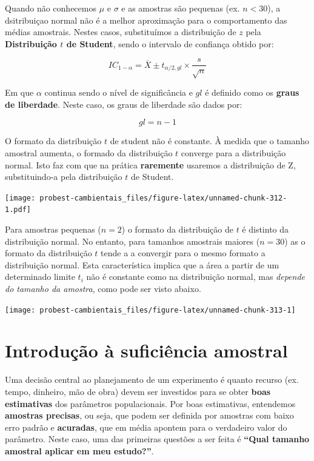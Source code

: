 \documentclass[
]{book}
\begin{document}
Quando não conhecemos \(\mu\) e \(\sigma\) e as amostras são pequenas (ex. \(n<30\)), a dsitribuiçao normal não é a melhor aproximação para o comportamento das médias amostrais. Nestes casos, substituímos a distribuição de \(z\) pela \textbf{Distribuição \(t\) de Student}, sendo o intervalo de confiança obtido por:

\[IC_{1-\alpha} = \overline{X} \pm t_{\alpha/2, gl} \times \frac{s}{\sqrt{n}}\]

Em que \(\alpha\) continua sendo o nível de significância e \(gl\) é definido como os \textbf{graus de liberdade}. Neste caso, os graus de liberdade são dados por:

\[gl = n-1\]

O formato da distribuição \(t\) de student não é constante. À medida que o tamanho amostral aumenta, o formado da distribuição \(t\) converge para a distribuição normal. Isto faz com que na prática \textbf{raremente} usaremos a distribuição de Z, substituindo-a pela distribuição \(t\) de Student.

\texttt{[image: probest-cambientais\_files/figure-latex/unnamed-chunk-312-1.pdf]}

Para amostras pequenas (\(n = 2\)) o formato da distribuição de \(t\) é distinto da distribuição normal. No entanto, para tamanhos amostrais maiores (\(n = 30\)) as o formato da distribuição \(t\) tende a a convergir para o mesmo formato a distribuição normal. Esta característica implica que a área a partir de um determinado limite \(t_i\) não é constante como na distribuição normal, mas \emph{depende do tamanho da amostra}, como pode ser visto abaixo.

\begin{center}\texttt{[image: probest-cambientais\_files/figure-latex/unnamed-chunk-313-1]} \end{center}

\hypertarget{introduuxe7uxe3o-uxe0-suficiuxeancia-amostral}{%
\section{Introdução à suficiência amostral}\label{introduuxe7uxe3o-uxe0-suficiuxeancia-amostral}}

Uma decisão central ao planejamento de um experimento é quanto recurso (ex. tempo, dinheiro, mão de obra) devem ser investidos para se obter \textbf{boas estimativas} dos parâmetros populacionais. Por boas estimativas, entendemos \textbf{amostras precisas}, ou seja, que podem ser definida por amostras com baixo erro padrão e \textbf{acuradas}, que em média apontem para o verdadeiro valor do parâmetro. Neste caso, uma das primeiras questões a ser feita é \textbf{``Qual tamanho amostral aplicar em meu estudo?''}.
\end{document}
